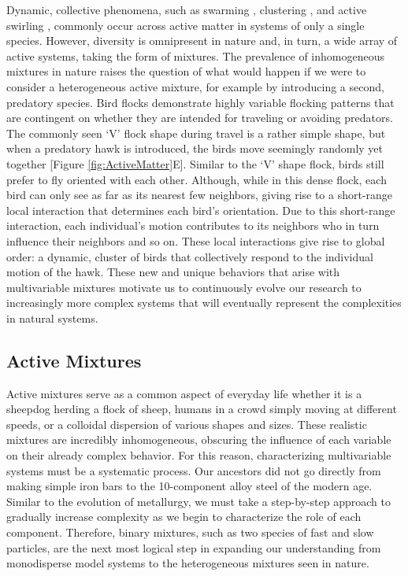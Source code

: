 \documentclass[11pt]{article}
\begin{document}
Dynamic, collective phenomena, such as swarming \cite{Vicsek, Romanczuk}, clustering \cite{Peruani2, Wensink, Yang7}, and active swirling \cite{Aranson, Drescher2}, commonly occur across active matter in systems of only a single species. However, diversity is omnipresent in nature and, in turn, a wide array of active systems, taking the form of mixtures.  The prevalence of inhomogeneous mixtures in nature raises the question of what  would happen if we were to consider a heterogeneous active mixture, for example by introducing a second, predatory species. Bird flocks demonstrate highly variable flocking patterns that are contingent on whether they are intended for traveling or avoiding predators.  The commonly seen `V' flock shape during travel is a rather simple shape, but when a predatory hawk is introduced, the birds move seemingly randomly yet together [Figure \ref{fig:ActiveMatter}E].  Similar to the `V' shape flock, birds still prefer to fly oriented with each other.  Although, while in this dense flock, each bird can only see as far as its nearest few neighbors, giving rise to a short-range local interaction that determines each bird's orientation.  Due to this short-range interaction, each individual's motion contributes to its neighbors who in turn influence their neighbors and so on.  These local interactions give rise to global order: a dynamic, cluster of birds that collectively respond to the individual motion of the hawk.  These new and unique behaviors that arise with multivariable mixtures motivate us to continuously evolve our research to increasingly more complex systems that will eventually represent the complexities in natural systems.

\subsection{Active Mixtures}

Active mixtures serve as a common aspect of everyday life whether it is a sheepdog herding a flock of sheep, humans in a crowd simply moving at different speeds, or a colloidal dispersion of various shapes and sizes.  These realistic mixtures are incredibly inhomogeneous, obscuring the influence of each variable on their already complex behavior. For this reason, characterizing multivariable systems must be a systematic process. Our ancestors did not go directly from making simple iron bars to the 10-component alloy steel of the modern age. Similar to the evolution of metallurgy, we must take a step-by-step approach to gradually increase complexity as we begin to characterize the role of each component.  Therefore, binary mixtures, such as two species of fast and slow particles, are the next most logical step in expanding our understanding from monodisperse model systems to the heterogeneous mixtures seen in nature.
\end{document}
